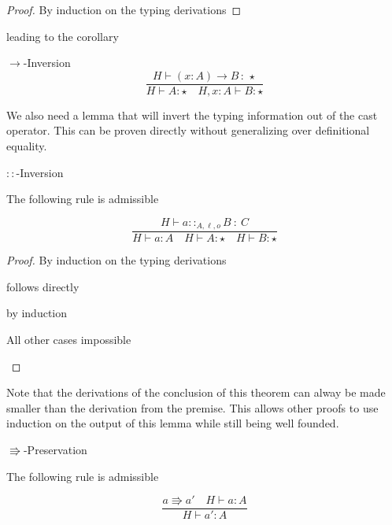 \begin{proof}
By induction on the typing derivations
\end{proof}
leading to the corollary
\begin{cor}
$\rightarrow$-Inversion
\[
\frac{H\vdash\left(x:A\right)\rightarrow B\,:\,\star}{H\vdash A:\star\quad H,x:A\vdash B:\star}
\]
\end{cor}
 
We also need a lemma that will invert the typing information out of the cast operator.
This can be proven directly without generalizing over definitional equality.
 
\begin{lem}
$::$-Inversion
 
The following rule is admissible
\end{lem}
 
\[
\frac{H\vdash a::_{A,\ell ,o}B\::\:C}{H\vdash a:A\quad H\vdash A:\star\quad H\vdash B:\star}
\]
 
\begin{proof}
By induction on the typing derivations
 
\begin{casenv}
 \item {} follows directly
 \item {} by induction
 \item All other cases impossible
\end{casenv}
\end{proof}
 
Note that the derivations of the conclusion of this theorem can alway be made smaller than the derivation from the premise.
This allows other proofs to use induction on the output of this lemma while still being well founded.
 
\begin{thm}
$\Rrightarrow$-Preservation
 
The following rule is admissible
 
\[
\frac{a\Rrightarrow a'\quad H\vdash a:A}{H\vdash a':A}
\]
\end{thm}
 
